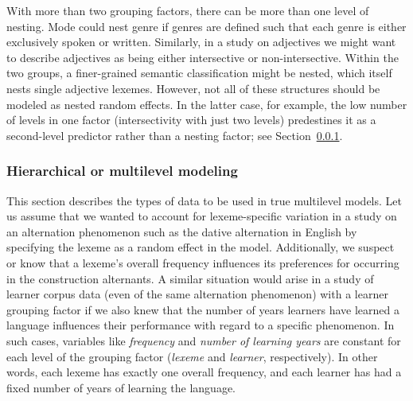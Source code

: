 With more than two grouping factors, there can be more than one level of nesting.
Mode could nest genre if genres are defined such that each genre is either exclusively spoken or written.
Similarly, in a study on adjectives we might want to describe adjectives as being either intersective or non-intersective.
Within the two groups, a finer-grained semantic classification might be nested, which itself nests single adjective lexemes.
However, not all of these structures should be modeled as nested random effects.
In the latter case, for example, the low number of levels in one factor (intersectivity with just two levels) predestines it as a second-level predictor rather than a nesting factor; see Section~\ref{sec:hierarchicalormultilevelmodels}.

\subsubsection{Hierarchical or multilevel modeling}
\label{sec:hierarchicalormultilevelmodels}

This section describes the types of data to be used in true multilevel models.
Let us assume that we wanted to account for lexeme-specific variation in a study on an alternation phenomenon such as the dative alternation in English by specifying the lexeme as a random effect in the model.
Additionally, we suspect or know that a lexeme's overall frequency influences its preferences for occurring in the construction alternants.
A similar situation would arise in a study of learner corpus data (even of the same alternation phenomenon) with a learner grouping factor if we also knew that the number of years learners have learned a language influences their performance with regard to a specific phenomenon.
In such cases, variables like \textit{frequency} and \textit{number of learning years} are constant for each level of the grouping factor (\textit{lexeme} and \textit{learner}, respectively).
In other words, each lexeme has exactly one overall frequency, and each learner has had a fixed number of years of learning the language.

